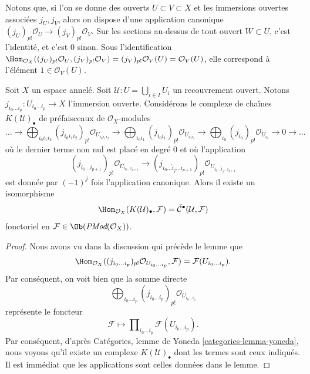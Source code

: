 \medskip\noindent
Notons que, si l'on se donne des ouverts $U \subset V \subset X$ et les immersions ouvertes associées $j_U, j_V$, alors on dispose d'une application canonique $(j_U)_{p!}\mathcal{O}_U \to (j_V)_{p!}\mathcal{O}_V$. Sur les sections au-dessus de tout ouvert $W \subset U$, c'est l'identité, et c'est $0$ sinon. Sous l'identification $\Hom_{\mathcal{O}_X}((j_U)_{p!}\mathcal{O}_U, (j_V)_{p!}\mathcal{O}_V) =
(j_V)_{p!}\mathcal{O}_V(U) = \mathcal{O}_V(U)$, elle correspond à l'élément $1 \in \mathcal{O}_V(U)$.

\begin{lemma}

\label{lemma-cech-map-into}
Soit $X$ un espace annelé. Soit $\mathcal{U} : U = \bigcup_{i \in I} U_i$ un recouvrement ouvert. Notons $j_{i_0\ldots i_p} : U_{i_0 \ldots i_p} \to X$ l'immersion ouverte. Considérons le complexe de chaînes $K(\mathcal{U})_\bullet$ de préfaisceaux de $\mathcal{O}_X$-modules $$
\ldots
\to
\bigoplus_{i_0i_1i_2} (j_{i_0i_1i_2})_{p!}\mathcal{O}_{U_{i_0i_1i_2}}
\to
\bigoplus_{i_0i_1} (j_{i_0i_1})_{p!}\mathcal{O}_{U_{i_0i_1}}
\to
\bigoplus_{i_0} (j_{i_0})_{p!}\mathcal{O}_{U_{i_0}}
\to 0 \to \ldots
$$ où le dernier terme non nul est placé en degré $0$ et où l'application $$
(j_{i_0\ldots i_{p + 1}})_{p!}\mathcal{O}_{U_{i_0\ldots i_{p + 1}}}
\longrightarrow
(j_{i_0\ldots \hat i_j \ldots i_{p + 1}})_{p!}
\mathcal{O}_{U_{i_0\ldots \hat i_j \ldots i_{p + 1}}}
$$ est donnée par $(-1)^j$ fois l'application canonique. Alors il existe un isomorphisme $$
\Hom_{\mathcal{O}_X}(K(\mathcal{U})_\bullet, \mathcal{F})
=
\check{\mathcal{C}}^\bullet(\mathcal{U}, \mathcal{F})
$$ fonctoriel en $\mathcal{F} \in \Ob(\textit{PMod}(\mathcal{O}_X))$.
\end{lemma}

\begin{proof}

Nous avons vu dans la discussion qui précède le lemme que
$$
\Hom_{\mathcal{O}_X}(
(j_{i_0\ldots i_p})_{p!}\mathcal{O}_{U_{i_0\ldots i_p}},
\mathcal{F})
=
\mathcal{F}(U_{i_0\ldots i_p}).
$$
Par conséquent, on voit bien que la somme directe
$$
\bigoplus\nolimits_{i_0 \ldots i_p}
(j_{i_0 \ldots i_p})_{p!}\mathcal{O}_{U_{i_0 \ldots i_p}}
$$
représente le foncteur
$$
\mathcal{F}
\longmapsto
\prod\nolimits_{i_0\ldots i_p} \mathcal{F}(U_{i_0\ldots i_p}).
$$
Par conséquent, d'après Catégories, lemme de Yoneda \ref{categories-lemma-yoneda},
nous voyons qu'il existe un complexe $K(\mathcal{U})_\bullet$ dont les termes sont ceux indiqués. Il est immédiat que les applications sont celles données dans le lemme.

\end{proof}

